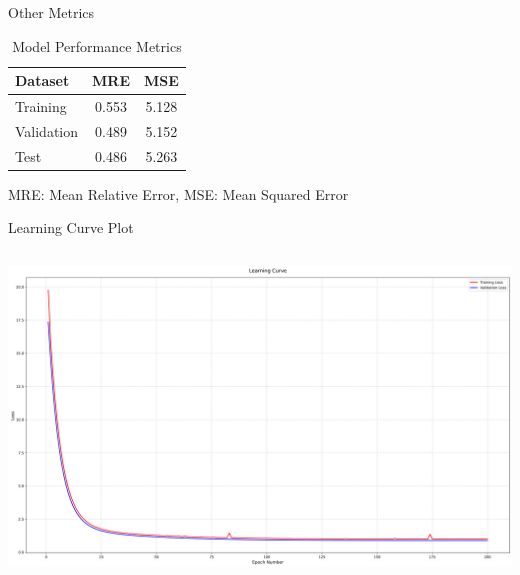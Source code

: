 \documentclass{beamer}
\begin{document}
\begin{frame}{Other Metrics}
    \begin{table}
        \centering
        \begin{tabular}{lcc}
            \toprule
            \textbf{Dataset} & \textbf{MRE} & \textbf{MSE} \\
            \midrule
            Training & 0.553 & 5.128 \\
            Validation & 0.489 & 5.152 \\
            Test & 0.486 & 5.263 \\
            \bottomrule
        \end{tabular}
        \caption{Model Performance Metrics}
        \label{tab:metrics}
        \footnotesize{MRE: Mean Relative Error, MSE: Mean Squared Error}
    \end{table}
\end{frame}

\begin{frame}{Learning Curve Plot}
    \begin{columns}[c] %
            \centering
            \includegraphics[width=\linewidth]{first.png}
            \text{}  %
        
    \end{columns}
\end{frame}
\end{document}
